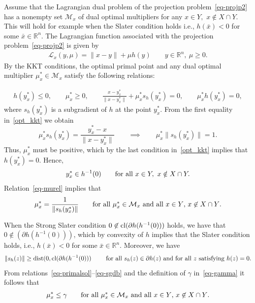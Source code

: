 \documentclass{article}
\def\dist{{\rm dist}}
\theoremstyle{plain}
\theoremstyle{definition}
\theoremstyle{remark}
\begin{document}
Assume that the Lagrangian dual problem of the projection problem~\eqref{eq-projp2} has a nonempty set $\mathcal{M}_x$ of dual optimal multipliers for any $x\in Y,$ $x\notin X\cap Y$. 
This will hold for example when the Slater condition holds i.e., $h(\bar x)<0$ for some $\bar x\in\mathbb{R}^n$. The
Lagrangian function associated with the projection problem~\eqref{eq-projp2} is given by
\begin{align*}
    \mathcal{L}_x(y,\mu) = \|x - y\| + \mu h(y)\qquad y\in \mathbb{R}^n,\ \mu\ge0.
\end{align*}
By the KKT conditions, the optimal primal point and any dual optimal multiplier $\mu_x^*\in\mathcal{M}_x$ satisfy the following relations:

\begin{align}
    h(y_x^*)\le 0,\qquad
\mu^*_x\ge 0, \qquad \frac{x-y_x^*}{\|x-y_x^*\|} + \mu^*_x s_h(y^*_x)=0,\qquad \mu^*_x h(y_x^*) = 0, \label{opt_kkt}
\end{align}
where $s_h(y^*_x)$ is a subgradient of $h$ at the point $y_x^*$.
From the first equality in~\eqref{opt_kkt} we obtain
\begin{equation}\label{eq-murel}
    \mu^*_x s_h(y^*_x)= \frac{y_x^*-x}{\|x-y_x^*\|}\qquad\implies\qquad \mu^*_x \|s_h(y^*_x)\|=1.
    \end{equation}
Thus, $\mu^*_x$ must be positive, which by the last condition in~\eqref{opt_kkt} implies that $h(y^*_x)=0$. Hence,
\begin{equation}\label{eq-primalsol}
    y_x^*\in h^{-1}(0)\qquad\hbox{for all }x\in Y, \ x\notin X\cap Y.
    \end{equation}
Relation~\eqref{eq-murel} implies that 
\begin{align}\label{eq-musgd}
\mu^*_x=\frac{1}{\|s_h(y^*_x)\|}\qquad \hbox{for all $\mu_x^*\in\mathcal{M}_x$ and all $x\in Y$, $x\not\in X\cap Y$}.
\end{align}

When the Strong Slater condition $0 \not\in {\rm cl}(\partial h(h^{-1}(0)))$ holds, we have that  $0 \not\in (\partial h(h^{-1}(0)))$, which by convexity of $h$ implies that the Slater condition holds, i.e., $h(\bar x)<0$ for some $\bar x\in\mathbb{R}^n$. Moreover, we have
\begin{align}\label{eq-sgdb}
\|s_h(z)\|\ge \dist(0,{\rm cl}(\partial h(h^{-1}(0)))\qquad\hbox{ for all $s_h(z)\in \partial h(z)$ and 
for all $z$ satisfying $h(z)=0$}.
\end{align}
From relations~\eqref{eq-primalsol}--\eqref{eq-sgdb} and the definition of $\gamma$ in~\eqref{eq-gamma} it follows that 
\begin{align}\label{eq-mulb}
\mu^*_x\le \gamma \qquad \hbox{for all $\mu_x^*\in\mathcal{M}_x$ and all $x\in Y$, $x\not\in X\cap Y$}.
\end{align}
\end{document}
